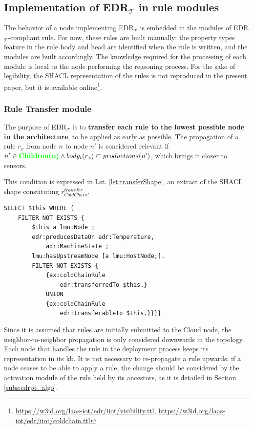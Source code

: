 \documentclass{iosart2c}
\newcommand{\edrt}{EDR$_{\mathcal{T}}$\xspace}
\newcommand{\added}[1]{\textcolor{green}{\textbf{#1}}}
\begin{document}
\subsection{Implementation of \edrt in rule modules}
\label{subs:edrt_modules}
The behavior of a node implementing \edrt is embedded in the modules of \edrt-compliant rule.
For now, these rules are built manually: the property types feature in the rule body and head are identified when the rule is written, and the modules are built accordingly.
The knowledge required for the processing of each module is local to the node performing the reasoning process. 
For the sake of legibility, the SHACL representation of the rules is not reproduced in the present paper, but it is available online\footnote{\url{https://w3id.org/laas-iot/edr/iiot/visibility.ttl}, \url{https://w3id.org/laas-iot/edr/iiot/coldchain.ttl}}.

\subsubsection{Rule Transfer module}

The purpose of \edrt is to \textbf{transfer each rule to the lowest possible node in the architecture}, to be applied as early as possible. 
The propagation of a rule $r_{x}$ from node $n$ to node $n'$ is considered relevant if $n' \in \added{Children(n)} \land body_t(r_{x}) \subset productions(n')$, which brings it closer to sensors. 

This condition is expressed in Lst. \ref{lst:transferShape}, an extract of the SHACL shape constituting $r_{ColdChain}^{transfer}$.
%
\begin{lstlisting}[float, caption=$r_{ColdChain}^{transfer}$ shape, label=lst:transferShape]
SELECT $this WHERE {
	FILTER NOT EXISTS {
		$this a lmu:Node ;
		edr:producesDataOn adr:Temperature,
			adr:MachineState ;
		lmu:hasUpstreamNode [a lmu:HostNode;].
		FILTER NOT EXISTS {
			{ex:coldChainRule 
				edr:transferredTo $this.}
			UNION
			{ex:coldChainRule 
				edr:transferableTo $this.}}}}
\end{lstlisting}

Since it is assumed that rules are initially submitted to the Cloud node, the neighbor-to-neighbor propagation is only considered downwards in the topology.
Each node that handles the rule in the deployment process keeps its representation in its \gls{kb}.
It is not necessary to re-propagate a rule upwards: if a node ceases to be able to apply a rule, the change should be considered by the activation module of the rule held by its ancestors, as it is detailed in Section \textsection \ref{subs:edrpt_algo}.
\end{document}
